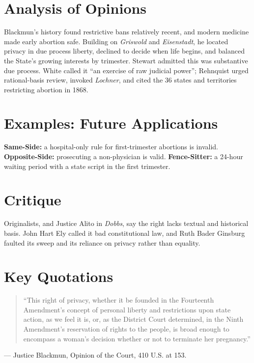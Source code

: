 \documentclass[12pt]{article}
\begin{document}
\section{Analysis of Opinions}
Blackmun's history found restrictive bans relatively recent, and modern medicine made early abortion safe. Building on \textit{Griswold} and \textit{Eisenstadt}, he located privacy in due process liberty, declined to decide when life begins, and balanced the State's growing interests by trimester. Stewart admitted this was substantive due process. White called it ``an exercise of raw judicial power''; Rehnquist urged rational-basis review, invoked \textit{Lochner}, and cited the 36 states and territories restricting abortion in 1868.

\section{Examples: Future Applications}
\textbf{Same-Side:} a hospital-only rule for first-trimester abortions is invalid. \textbf{Opposite-Side:} prosecuting a non-physician is valid. \textbf{Fence-Sitter:} a 24-hour waiting period with a state script in the first trimester.

\section{Critique}
Originalists, and Justice Alito in \textit{Dobbs}, say the right lacks textual and historical basis. John Hart Ely called it bad constitutional law, and Ruth Bader Ginsburg faulted its sweep and its reliance on privacy rather than equality.

\section{Key Quotations}
\begin{quote}
``This right of privacy, whether it be founded in the Fourteenth Amendment's concept of personal liberty and restrictions upon state action, as we feel it is, or, as the District Court determined, in the Ninth Amendment's reservation of rights to the people, is broad enough to encompass a woman's decision whether or not to terminate her pregnancy.''
\end{quote}
\noindent --- Justice Blackmun, Opinion of the Court, 410 U.S. at 153.
\end{document}
